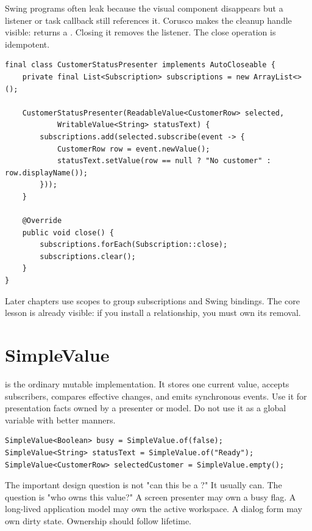 Swing programs often leak because the visual component disappears but a listener
or task callback still references it. Corusco makes the cleanup handle visible:
 returns a . Closing it removes the listener.
The close operation is idempotent.

\begin{lstlisting}[caption={A screen owns the subscriptions it creates.}]
final class CustomerStatusPresenter implements AutoCloseable {
    private final List<Subscription> subscriptions = new ArrayList<>();

    CustomerStatusPresenter(ReadableValue<CustomerRow> selected,
            WritableValue<String> statusText) {
        subscriptions.add(selected.subscribe(event -> {
            CustomerRow row = event.newValue();
            statusText.setValue(row == null ? "No customer" : row.displayName());
        }));
    }

    @Override
    public void close() {
        subscriptions.forEach(Subscription::close);
        subscriptions.clear();
    }
}
\end{lstlisting}

Later chapters use scopes to group subscriptions and Swing bindings. The core
lesson is already visible: if you install a relationship, you must own its
removal.

\section{SimpleValue}

 is the ordinary mutable implementation. It stores one
current value, accepts subscribers, compares effective changes, and emits
synchronous events. Use it for presentation facts owned by a presenter or model.
Do not use it as a global variable with better manners.

\begin{lstlisting}[caption={Simple presentation facts.}]
SimpleValue<Boolean> busy = SimpleValue.of(false);
SimpleValue<String> statusText = SimpleValue.of("Ready");
SimpleValue<CustomerRow> selectedCustomer = SimpleValue.empty();
\end{lstlisting}

The important design question is not "can this be a ?" It
usually can. The question is "who owns this value?" A screen presenter may own a
busy flag. A long-lived application model may own the active workspace. A dialog
form may own dirty state. Ownership should follow lifetime.

